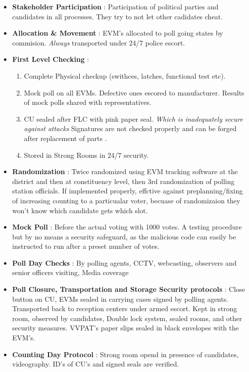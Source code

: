 \documentclass[12pt]{report}
\begin{document}
\begin{itemize}
  \item \textbf{Stakeholder Participation} : Participation of political parties and candidates in all processes. They try to not let other cadidates cheat.
  \item \textbf{Allocation & Movement} : EVM's allocated to poll going states by commision. \textit{Always} transported under 24/7 police escort.
  \item \textbf{First Level Checking} : 
        \begin{enumerate}
          \item Complete Physical checkup (swithces, latches, functional test etc).
          \item Mock poll on all EVMs. Defective ones escored to manufacturer. Results of mock polls shared with representatives.
          \item CU sealed after FLC with pink paper seal. \textit{Which is inadequately secure against attacks} Signatures are not checked properly and can be forged after replacement of parts .
          \item Stored in Strong Rooms in 24/7 security. 
        \end{enumerate}
  \item  \textbf{Randomization} : Twice randomized using EVM tracking software at the district and then at constituency level, then 3rd randomization of polling station officials. If implemented properly, effctive against preplanning/fixing of increasing counting to a particualar voter, becuase of randomizaion they won't know which candidate gets which slot.
  \item  \textbf{Mock Poll} : Before the actual voting with 1000 votes. A testing procedure but by no means a security safeguard, as the malicious code can easily be instructed to run after a preset number of votes. 
  \item  \textbf{Poll Day Checks} : By polling agents, CCTV, webcasting, observers and senior officers visiting, Media coverage
  \item  \textbf{Poll Closure, Transportation and Storage Security protocols} : Close button on CU, EVMs sealed in carrying cases signed by polling agents. Transported back to reception centers under armed escort. Kept in strong room, observed by candidates, Double lock system, sealed rooms, and other security measures.  VVPAT's paper slips sealed in black envelopes with the EVM's.
  \item  \textbf{Counting Day Protocol} : Strong room opend in presence of candidates, videography. ID's of CU's and signed seals are verified.
\end{itemize}
\end{document}
